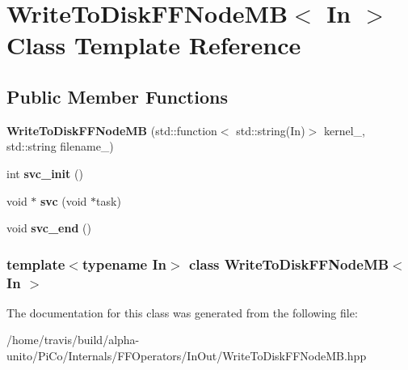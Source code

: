 \hypertarget{class_write_to_disk_f_f_node_m_b}{\section{\-Write\-To\-Disk\-F\-F\-Node\-M\-B$<$ \-In $>$ \-Class \-Template \-Reference}
\label{class_write_to_disk_f_f_node_m_b}
}
\subsection*{\-Public \-Member \-Functions}
\begin{DoxyCompactItemize}
\item 
\hypertarget{class_write_to_disk_f_f_node_m_b_adbcf5f0002beb3b02253d5655593171d}{{\bfseries \-Write\-To\-Disk\-F\-F\-Node\-M\-B} (std\-::function$<$ std\-::string(\-In)$>$ kernel\-\_\-, std\-::string filename\-\_\-)}\label{class_write_to_disk_f_f_node_m_b_adbcf5f0002beb3b02253d5655593171d}

\item 
\hypertarget{class_write_to_disk_f_f_node_m_b_a4e478fa43f2cfaeca8cd8d083e86530a}{int {\bfseries svc\-\_\-init} ()}\label{class_write_to_disk_f_f_node_m_b_a4e478fa43f2cfaeca8cd8d083e86530a}

\item 
\hypertarget{class_write_to_disk_f_f_node_m_b_abce2906ec0667b0d938112bb58400e5b}{void $\ast$ {\bfseries svc} (void $\ast$task)}\label{class_write_to_disk_f_f_node_m_b_abce2906ec0667b0d938112bb58400e5b}

\item 
\hypertarget{class_write_to_disk_f_f_node_m_b_a163eab49dbd21de69ae5400973e7ce36}{void {\bfseries svc\-\_\-end} ()}\label{class_write_to_disk_f_f_node_m_b_a163eab49dbd21de69ae5400973e7ce36}

\end{DoxyCompactItemize}
\subsubsection*{template$<$typename In$>$ class Write\-To\-Disk\-F\-F\-Node\-M\-B$<$ In $>$}



\-The documentation for this class was generated from the following file\-:\begin{DoxyCompactItemize}
\item 
/home/travis/build/alpha-\/unito/\-Pi\-Co/\-Internals/\-F\-F\-Operators/\-In\-Out/\-Write\-To\-Disk\-F\-F\-Node\-M\-B.\-hpp\end{DoxyCompactItemize}

